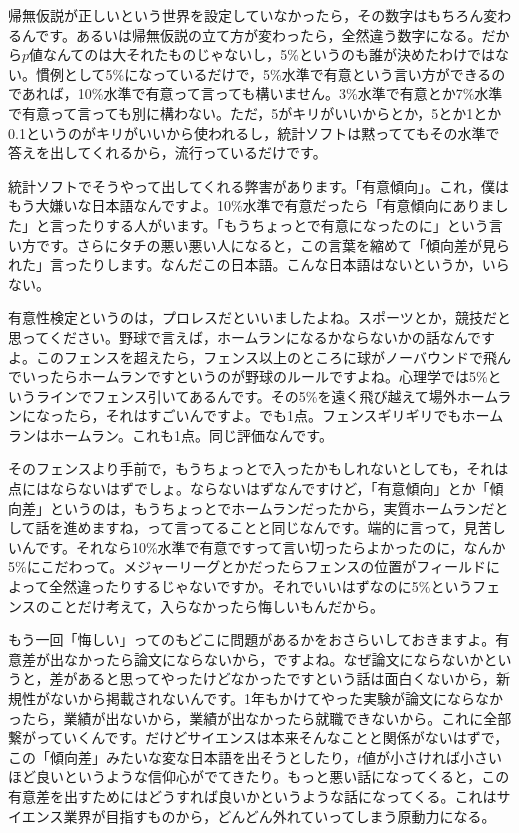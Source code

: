 \documentclass{ltjsbook}
\begin{document}
帰無仮説が正しいという世界を設定していなかったら，その数字はもちろん変わるんです。あるいは帰無仮説の立て方が変わったら，全然違う数字になる。だから$p$値なんてのは大それたものじゃないし，5\%というのも誰が決めたわけではない。慣例として5\%になっているだけで，5\%水準で有意という言い方ができるのであれば，10\%水準で有意って言っても構いません。3\%水準で有意とか7\%水準で有意って言っても別に構わない。ただ，5がキリがいいからとか，5とか1とか0.1というのがキリがいいから使われるし，統計ソフトは黙っててもその水準で答えを出してくれるから，流行っているだけです。

統計ソフトでそうやって出してくれる弊害があります。「有意傾向」。これ，僕はもう大嫌いな日本語なんですよ。10\%水準で有意だったら「有意傾向にありました」と言ったりする人がいます。「もうちょっとで有意になったのに」という言い方です。さらにタチの悪い悪い人になると，この言葉を縮めて「傾向差が見られた」言ったりします。なんだこの日本語。こんな日本語はないというか，いらない。

有意性検定というのは，プロレスだといいましたよね。スポーツとか，競技だと思ってください。野球で言えば，ホームランになるかならないかの話なんですよ。このフェンスを超えたら，フェンス以上のところに球がノーバウンドで飛んでいったらホームランですというのが野球のルールですよね。心理学では5\%というラインでフェンス引いてあるんです。その5\%を遠く飛び越えて場外ホームランになったら，それはすごいんですよ。でも1点。フェンスギリギリでもホームランはホームラン。これも1点。同じ評価なんです。

そのフェンスより手前で，もうちょっとで入ったかもしれないとしても，それは点にはならないはずでしょ。ならないはずなんですけど，「有意傾向」とか「傾向差」というのは，もうちょっとでホームランだったから，実質ホームランだとして話を進めますね，って言ってることと同じなんです。端的に言って，見苦しいんです。それなら10\%水準で有意ですって言い切ったらよかったのに，なんか5\%にこだわって。メジャーリーグとかだったらフェンスの位置がフィールドによって全然違ったりするじゃないですか。それでいいはずなのに5\%というフェンスのことだけ考えて，入らなかったら悔しいもんだから。

もう一回「悔しい」ってのもどこに問題があるかをおさらいしておきますよ。有意差が出なかったら論文にならないから，ですよね。なぜ論文にならないかというと，差があると思ってやったけどなかったですという話は面白くないから，新規性がないから掲載されないんです。1年もかけてやった実験が論文にならなかったら，業績が出ないから，業績が出なかったら就職できないから。これに全部繋がっていくんです。だけどサイエンスは本来そんなことと関係がないはずで，この「傾向差」みたいな変な日本語を出そうとしたり，$t$値が小さければ小さいほど良いというような信仰心がでてきたり。もっと悪い話になってくると，この有意差を出すためにはどうすれば良いかというような話になってくる。これはサイエンス業界が目指すものから，どんどん外れていってしまう原動力になる。
\end{document}
